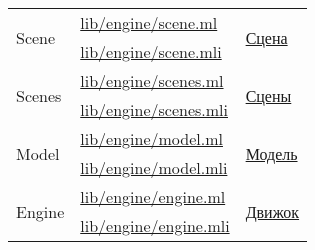 \begin{centering}
\begin{longtable}{|l|l|l|}
        \multirow{2}{*}{Scene}                                & \href{https://github.com/prekel/chapgame/blob/master/lib/engine/scene.ml}{lib/engine/scene.ml}                                 & \multirow{2}{*}{\hyperref[scenedescr]{Сцена}}                                   \\*
                                                              & \href{https://github.com/prekel/chapgame/blob/master/lib/engine/scene.mli}{lib/engine/scene.mli}                               &                                                                                 \\ \hline
        \multirow{2}{*}{Scenes}                               & \href{https://github.com/prekel/chapgame/blob/master/lib/engine/scenes.ml}{lib/engine/scenes.ml}                               & \multirow{2}{*}{\hyperref[scenedescr]{Сцены}}                                   \\*
                                                              & \href{https://github.com/prekel/chapgame/blob/master/lib/engine/scenes.mli}{lib/engine/scenes.mli}                             &                                                                                 \\ \hline
        \multirow{2}{*}{Model}                                & \href{https://github.com/prekel/chapgame/blob/master/lib/engine/model.ml}{lib/engine/model.ml}                                 & \multirow{2}{*}{\hyperref[modeldescr]{Модель}}                                  \\*
                                                              & \href{https://github.com/prekel/chapgame/blob/master/lib/engine/model.mli}{lib/engine/model.mli}                               &                                                                                 \\ \hline
        \multirow{2}{*}{Engine}                               & \href{https://github.com/prekel/chapgame/blob/master/lib/engine/engine.ml}{lib/engine/engine.ml}                               & \multirow{2}{*}{\hyperref[enginedescr]{Движок}}                                 \\*
                                                              & \href{https://github.com/prekel/chapgame/blob/master/lib/engine/engine.mli}{lib/engine/engine.mli}                             &                                                                                 \\ \hline
    \end{longtable}
\end{centering}

